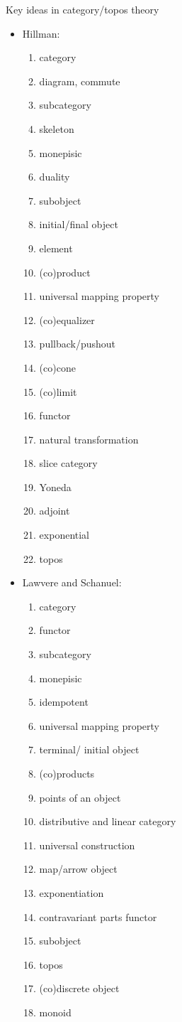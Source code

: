 \begin{plSection}{Key ideas in category/topos theory}
\begin{itemize}
\item Hillman:~\cite{Hillman:2001:CatPrimer}
\begin{enumerate}
  \item category
  \item diagram, commute
  \item subcategory
  \item skeleton
  \item monepisic
  \item duality
  \item subobject
  \item initial/final object
  \item element
  \item (co)product
  \item universal mapping property
  \item (co)equalizer
  \item pullback/pushout
  \item (co)cone
  \item (co)limit
  \item functor
  \item natural transformation
  \item slice category
  \item Yoneda
  \item adjoint
  \item exponential
  \item topos
\end{enumerate}

\item Lawvere and Schanuel:~\cite{LawvereSchanuel:2009:ConceptualMath}
\begin{enumerate}
  \item category
  \item functor
  \item subcategory
  \item monepisic
  \item idempotent
  \item universal mapping property
  \item terminal/ initial object
  \item (co)products
  \item points of an object
  \item distributive and linear category
  \item universal construction
  \item map/arrow object
  \item exponentiation
  \item contravariant parts functor
  \item subobject
  \item topos
  \item (co)discrete object
  \item monoid
  

\end{enumerate}
\end{itemize}
\end{plSection}

